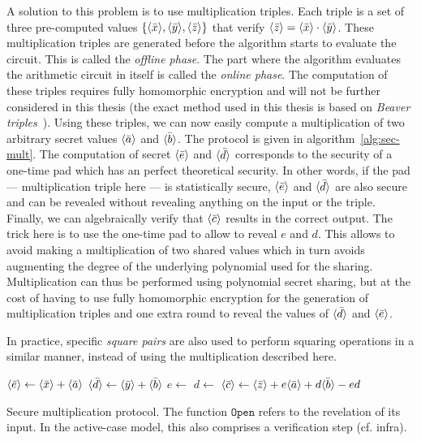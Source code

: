 A solution to this problem is to use multiplication triples. Each triple is a set of three pre-computed values $\left\{ \langle \bar{x} \rangle, \langle \bar{y} \rangle, \langle \bar{z} \rangle \right\}$ that verify $\langle \bar{z} \rangle=\langle \bar{x} \rangle\cdot \langle \bar{y} \rangle$. These multiplication triples are generated before the algorithm starts to evaluate the circuit. This is called the \emph{offline phase}. The part where the algorithm evaluates the arithmetic circuit in itself is called the \emph{online phase}. The computation of these triples requires fully homomorphic encryption and will not be further considered in this thesis (the exact method used in this thesis is based on \emph{Beaver triples}~\cite{Bar-Ilan1989Non-cryptographicInteraction,Pullonen2013ActivelyGeneration}). Using these triples, we can now easily compute a multiplication of two arbitrary secret values $\langle \bar{a} \rangle$ and $\langle \bar{b} \rangle$. The protocol is given in algorithm~\ref{alg:sec-mult}. The computation of secret $\langle \bar{e} \rangle$ and $\langle \bar{d} \rangle$ corresponds to the security of a one-time pad which has an perfect theoretical security. In other words, if the pad --- multiplication triple here --- is statistically secure, $\langle \bar{e} \rangle$ and $\langle \bar{d} \rangle$ are also secure and can be revealed without revealing anything on the input or the triple. Finally, we can algebraically verify that $\langle \bar{c} \rangle$ results in the correct output. The trick here is to use the one-time pad to allow to reveal $e$ and $d$. This allows to avoid making a multiplication of two shared values which in turn avoids augmenting the degree of the underlying polynomial used for the sharing. Multiplication can thus be performed using polynomial secret sharing, but at the cost of having to use fully homomorphic encryption for the generation of multiplication triples and one extra round to reveal the values of $\langle \bar{d} \rangle$ and $\langle \bar{e} \rangle$.

In practice, specific \emph{square pairs} are also used to perform squaring operations in a similar manner, instead of using the multiplication described here.

\begin{center}
\begin{algorithm}[H]
\DontPrintSemicolon
{}
$\langle \bar{e} \rangle \leftarrow \langle \bar{x} \rangle+\langle \bar{a} \rangle$ \;
$\langle \bar{d} \rangle \leftarrow \langle \bar{y} \rangle+\langle \bar{b} \rangle$ \;
$e \leftarrow$  \;
$d \leftarrow$  \;
$\langle \bar{c} \rangle \leftarrow \langle \bar{z} \rangle + e\langle \bar{a} \rangle + d\langle \bar{b} \rangle - ed$ \;
\caption[Secure multiplication protocol.]{Secure multiplication protocol. The function $\mathtt{Open}$ refers to the revelation of its input. In the active-case model, this also comprises a verification step (cf. infra).}
\label{alg:sec-mult}
\end{algorithm}
\end{center}

